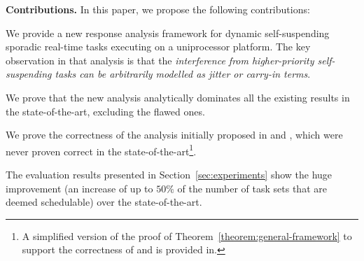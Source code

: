 \noindent\textbf{Contributions.} In this paper, we propose the following contributions:
\begin{compactitem}
\item We provide a new response analysis framework for dynamic self-suspending
  sporadic real-time tasks executing on a uniprocessor platform. The key observation in that analysis is that the \emph{interference from higher-priority
    self-suspending tasks can be arbitrarily modelled as jitter or
    carry-in terms}.
\item We prove that the new analysis analytically
  dominates all the existing results in the state-of-the-art, excluding the flawed ones.  
\item We prove the
  correctness of the analysis initially proposed in \cite[p.
  164-165]{Liu:2000:RS:518501} and
  \cite[p. 267]{DBLP:conf/rtss/RajkumarSL88}, which were never proven correct in the state-of-the-art\footnote{A simplified
    version of the proof of Theorem~\ref{theorem:general-framework} to support the correctness of \cite[p. 164-165]{Liu:2000:RS:518501} and \cite[p. 267]{DBLP:conf/rtss/RajkumarSL88} is
  provided in\cite{ChenHuangNelissen}.}.
\item The evaluation results presented in Section~\ref{sec:experiments} show the huge improvement (an increase of up to $50\%$ of the number of task sets that are deemed schedulable) over the state-of-the-art.
\end{compactitem}
